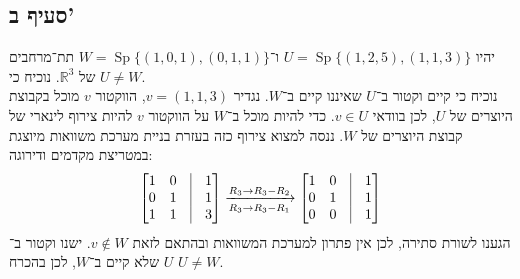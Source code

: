 \documentclass[a4paper,10pt]{article}
\DeclareMathOperator\Sp{Sp}
\def\RR{\mathbb{R}}
\begin{document}
	\subsection{סעיף ב'}
	יהיו $U = \Sp\{(1, 2, 5), (1, 1, 3)\}$
	ו־$W = \Sp\{(1, 0, 1), (0, 1, 1)\}$
	תת־מרחבים של $\RR^3$.
	נוכיח כי $U \ne W$. \\
	נוכיח כי קיים וקטור ב־$U$ שאיננו קיים ב־$W$.
	נגדיר $v = (1, 1, 3)$,
	הווקטור $v$ מוכל בקבוצת היוצרים של $U$, לכן בוודאי $v \in U$.
	כדי להיות מוכל ב־$W$ על הווקטור $v$ להיות צירוף לינארי של קבוצת היוצרים
	של $W$.
	ננסה למצוא צירוף כזה בעזרת בניית מערכת משוואות מיוצגת במטריצת מקדמים ודירוגה:
	\[
		\begin{bmatrix}
			1 & 0 & \vline & 1 \\
			0 & 1 & \vline & 1 \\
			1 & 1 & \vline & 3
		\end{bmatrix}
		\xrightarrow[R_3 \to R_3 - R_1]{R_3 \to R_3 - R_2}
		\begin{bmatrix}
			1 & 0 & \vline & 1 \\
			0 & 1 & \vline & 1 \\
			0 & 0 & \vline & 1
		\end{bmatrix}
	\]
	הגענו לשורת סתירה, לכן אין פתרון למערכת המשוואות ובהתאם לזאת $v \notin W$.
	ישנו וקטור ב־$U$ שלא קיים ב־$W$, לכן בהכרח $U \ne W$.
\end{document}
